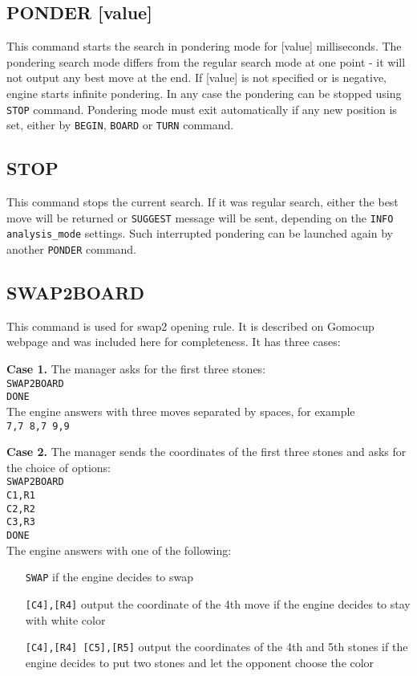 \documentclass[12pt,a4paper]{article}
\begin{document}
\subsection{PONDER [value]}
\label{cmd_ponder}
This command starts the search in pondering mode for [value] milliseconds. The pondering search mode differs from the regular search mode at one point - it will not output any best move at the end. If [value] is not specified or is negative, engine starts infinite pondering. In any case the pondering can be stopped using \texttt{STOP} command. Pondering mode must exit automatically if any new position is set, either by \texttt{BEGIN}, \texttt{BOARD} or \texttt{TURN} command.


\subsection{STOP}
\label{cmd_stop}
This command stops the current search. If it was regular search, either the best move will be returned or \texttt{SUGGEST} message will be sent, depending on the \texttt{INFO analysis{\_}mode} settings. Such interrupted pondering can be launched again by another \texttt{PONDER} command.


\subsection{SWAP2BOARD}
\label{cmd_swap2board}
This command is used for swap2 opening rule. It is described on Gomocup webpage and was included here for completeness. It has three cases:

\textbf{Case 1.} The manager asks for the first three stones:\\
\texttt{SWAP2BOARD}\\
\texttt{DONE}\\
The engine answers with three moves separated by spaces, for example\\
\texttt{7,7 8,7 9,9}

\textbf{Case 2.} The manager sends the coordinates of the first three stones and asks for the choice of options:\\
\texttt{SWAP2BOARD}\\
\texttt{C1,R1}\\
\texttt{C2,R2}\\
\texttt{C3,R3}\\
\texttt{DONE}\\
The engine answers with one of the following:
\begin{enumerate}[leftmargin=7.5em]
\item[\texttt{SWAP}]{if the engine decides to swap}
\item[\texttt{[C4],[R4]}]{output the coordinate of the 4th move if the engine decides to stay with white color}
\item[\texttt{[C4],[R4] [C5],[R5]}]{output the coordinates of the 4th and 5th stones if the engine decides to put two stones and let the opponent choose the color}
\end{enumerate}
\end{document}
